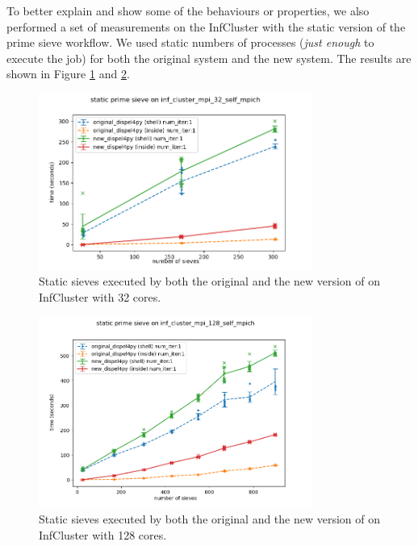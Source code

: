 To better explain and show some of the behaviours or properties, we also performed a set of measurements on the InfCluster with the static version of the prime sieve workflow. We used static numbers of processes (\emph{just enough} to execute the job) for both the original system and the new system. The results are shown in Figure  \ref{fig:sieve_static_32} and \ref{fig:sieve_static_128}.

\begin{figure}[h]
\centering
    \includegraphics[width=0.8\textwidth]{figures/sieve_static_32}
\caption{Static sieves executed by both the original and the new version of \dpy on InfCluster with 32 cores.}
\label{fig:sieve_static_32}
\end{figure}

\begin{figure}[h]
\centering
    \includegraphics[width=0.8\textwidth]{figures/sieve_static_128}
\caption{Static sieves executed by both the original and the new version of \dpy on InfCluster with 128 cores.}
\label{fig:sieve_static_128}
\end{figure}

